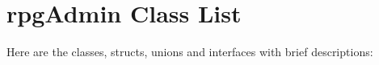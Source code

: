 \section{rpg\-Admin Class List}
Here are the classes, structs, unions and interfaces with brief descriptions:\begin{CompactList}
\item{}
\end{CompactList}
